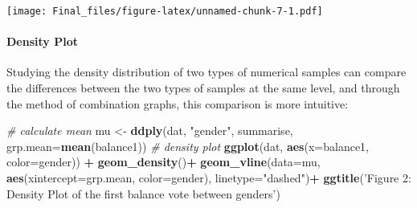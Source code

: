 \documentclass[
]{article}
\newenvironment{Shaded}{\begin{snugshade}}{\end{snugshade}}
\newcommand{\CommentTok}[1]{\textcolor[rgb]{0.56,0.35,0.01}{\textit{#1}}}
\newcommand{\DataTypeTok}[1]{\textcolor[rgb]{0.13,0.29,0.53}{#1}}
\newcommand{\KeywordTok}[1]{\textcolor[rgb]{0.13,0.29,0.53}{\textbf{#1}}}
\newcommand{\NormalTok}[1]{#1}
\newcommand{\OperatorTok}[1]{\textcolor[rgb]{0.81,0.36,0.00}{\textbf{#1}}}
\newcommand{\StringTok}[1]{\textcolor[rgb]{0.31,0.60,0.02}{#1}}
\begin{document}
\begin{Shaded}
\end{Shaded}

\texttt{[image: Final\_files/figure-latex/unnamed-chunk-7-1.pdf]}

\hypertarget{density-plot}{%
\paragraph{Density Plot}\label{density-plot}}

Studying the density distribution of two types of numerical samples can
compare the differences between the two types of samples at the same
level, and through the method of combination graphs, this comparison is
more intuitive:

\begin{Shaded}
\begin{Highlighting}[]
\CommentTok{# calculate mean}
\NormalTok{mu <-}\StringTok{ }\KeywordTok{ddply}\NormalTok{(dat, }\StringTok{"gender"}\NormalTok{, summarise, }\DataTypeTok{grp.mean=}\KeywordTok{mean}\NormalTok{(balance1))}
\CommentTok{# density plot}
\KeywordTok{ggplot}\NormalTok{(dat, }\KeywordTok{aes}\NormalTok{(}\DataTypeTok{x=}\NormalTok{balance1, }\DataTypeTok{color=}\NormalTok{gender)) }\OperatorTok{+}
\StringTok{  }\KeywordTok{geom_density}\NormalTok{()}\OperatorTok{+}
\StringTok{  }\KeywordTok{geom_vline}\NormalTok{(}\DataTypeTok{data=}\NormalTok{mu, }\KeywordTok{aes}\NormalTok{(}\DataTypeTok{xintercept=}\NormalTok{grp.mean, }\DataTypeTok{color=}\NormalTok{gender),}
             \DataTypeTok{linetype=}\StringTok{"dashed"}\NormalTok{)}\OperatorTok{+}
\StringTok{  }\KeywordTok{ggtitle}\NormalTok{(}\StringTok{'Figure 2: Density Plot of the first balance vote between genders'}\NormalTok{)}
\end{Highlighting}
\end{Shaded}
\end{document}
